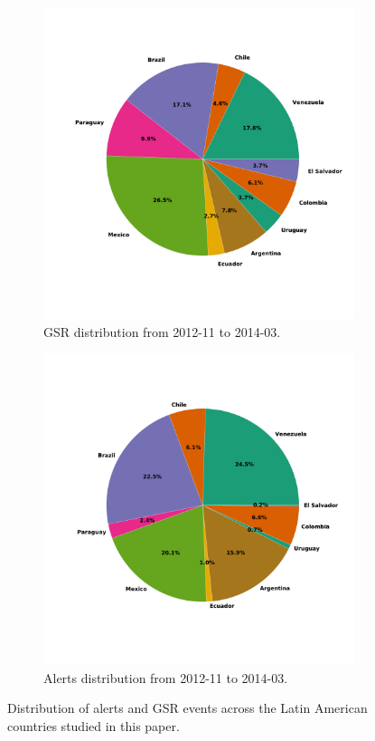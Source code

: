 \documentclass[letterpaper]{article}
\begin{document}
\begin{figure}
\centering
\begin{subfigure}{.7\columnwidth}
  \centering
  \includegraphics[scale=0.2]{gsr_distribution} 
  \caption{GSR distribution from 2012-11 to 2014-03.}
  \label{fig:gsrdistribution}
\end{subfigure}%
\begin{subfigure}{.7\columnwidth}
  \centering
  \includegraphics[scale=0.2]{pp_dist}
  \caption{Alerts distribution from 2012-11 to 2014-03.}
  \label{fig:ppdistribution}
\end{subfigure}
\caption{Distribution of alerts and GSR events across the Latin American countries studied in this paper.}
\label{fig:distribution}
\end{figure}
\end{document}

